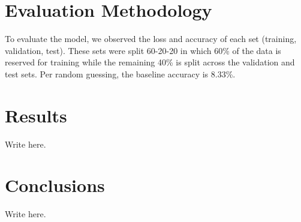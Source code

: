 \documentclass[10pt]{article}
\begin{document}
\section{Evaluation Methodology}

To evaluate the model, we observed the loss and accuracy of each set (training, validation, test). These sets were split 60-20-20 in which 60\% of the data is reserved for training while the remaining 40\% is split across the validation and test sets. Per random guessing, the baseline accuracy is 8.33\%.




\section{Results}

Write here. 





\section{Conclusions}

Write here. 




\end{document}
